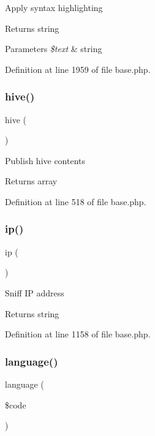 Apply syntax highlighting \begin{DoxyReturn}{Returns}
string 
\end{DoxyReturn}

\begin{DoxyParams}{Parameters}
{\em \$text} & string \\
\hline
\end{DoxyParams}


Definition at line 1959 of file base.\+php.

\hypertarget{class_base_a9492bc2587be1faa2fa7e69d2a89a53e}{}\label{class_base_a9492bc2587be1faa2fa7e69d2a89a53e} 
\subsubsection{\texorpdfstring{hive()}{hive()}}
{\footnotesize\ttfamily hive (\begin{DoxyParamCaption}{ }\end{DoxyParamCaption})}

Publish hive contents \begin{DoxyReturn}{Returns}
array 
\end{DoxyReturn}


Definition at line 518 of file base.\+php.

\hypertarget{class_base_a197bae3714812901860bd006b00f91de}{}\label{class_base_a197bae3714812901860bd006b00f91de} 
\subsubsection{\texorpdfstring{ip()}{ip()}}
{\footnotesize\ttfamily ip (\begin{DoxyParamCaption}{ }\end{DoxyParamCaption})}

Sniff IP address \begin{DoxyReturn}{Returns}
string 
\end{DoxyReturn}


Definition at line 1158 of file base.\+php.

\hypertarget{class_base_aeff6ba9b2402e9a6e39c424452f8ffb1}{}\label{class_base_aeff6ba9b2402e9a6e39c424452f8ffb1} 
\subsubsection{\texorpdfstring{language()}{language()}}
{\footnotesize\ttfamily language (\begin{DoxyParamCaption}\item[{}]{\$code }\end{DoxyParamCaption})}

